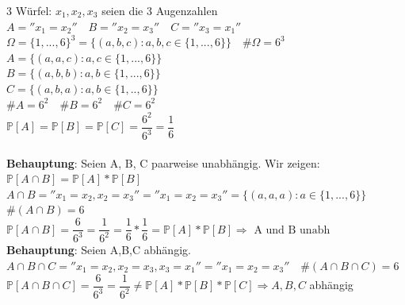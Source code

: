 3 Würfel: $x_1,x_2,x_3$ seien die 3 Augenzahlen\medskip\\
$A = ''x_1 = x_2'' \quad B = ''x_2 = x_3'' \quad C = ''x_3 = x_1''$\medskip\\
$\Omega = \{1,...,6\}^3 = \{(a,b,c):a,b,c \in \{1,...,6\}\} \quad \# \Omega = 6^3$\smallskip\\
$A = \{(a,a,c):a,c \in \{1,...,6\}\}$\\
$B = \{(a,b,b): a,b \in \{1,...,6\}\}$\\
$C = \{(a,b,a):a,b\in \{1,..,6\}\} $\medskip\\
$\#A=6^2\quad \# B= 6^2 \quad \#C=6^2$\medskip\\
$\mathds{P}[A] = \mathds{P}[B]=\mathds{P}[C]=\dfrac{6^2}{6^3} = \dfrac{1}{6}$\\\\
\textbf{Behauptung}: Seien A, B, C paarweise unabhängig. Wir zeigen: $\mathds{P}[A \cap B] = \mathds{P}[A] * \mathds{P}[B]$\smallskip\\
$A \cap B = ''x_1 = x_2, x_2 = x_3'' = ''x_1 = x_2 =x_3'' = \{(a,a,a):a \in \{1,...,6\}\} $\\$ \#(A\cap B) = 6$\smallskip\\
$\mathds{P}[A\cap B] = \dfrac{6}{6^3} = \dfrac{1}{6^2} = \dfrac{1}{6}* \dfrac{1}{6}= \mathds{P}[A]*\mathds{P}[B] \Rightarrow \text{ A und B unabh}$\medskip\\
\textbf{Behauptung}: Seien A,B,C abhängig. \\$A \cap B \cap C = ''x_1 = x_2, x_2 =x_3, x_3 = x_1'' = ''x_1 = x_2 =x_3'' \quad \#(A\cap B \cap C) = 6$\smallskip\\
$\mathds{P}[A \cap B \cap C]= \dfrac{6}{6^3} = \dfrac{1}{6^2} \neq \mathds{P}[A]*\mathds{P}[B]*\mathds{P}[C] \Rightarrow A,B,C$ abhängig
